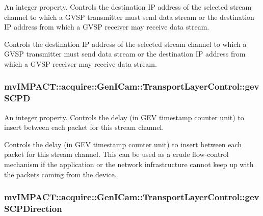 An integer property. Controls the destination I\+P address of the selected stream channel to which a G\+V\+S\+P transmitter must send data stream or the destination I\+P address from which a G\+V\+S\+P receiver may receive data stream. 

Controls the destination I\+P address of the selected stream channel to which a G\+V\+S\+P transmitter must send data stream or the destination I\+P address from which a G\+V\+S\+P receiver may receive data stream. \hypertarget{classmv_i_m_p_a_c_t_1_1acquire_1_1_gen_i_cam_1_1_transport_layer_control_a9364b85c25a2b2bb7f9e56a3076ee1be}{
\subsubsection[{gev\+S\+C\+P\+D}]{ mv\+I\+M\+P\+A\+C\+T\+::acquire\+::\+Gen\+I\+Cam\+::\+Transport\+Layer\+Control\+::gev\+S\+C\+P\+D}}\label{classmv_i_m_p_a_c_t_1_1acquire_1_1_gen_i_cam_1_1_transport_layer_control_a9364b85c25a2b2bb7f9e56a3076ee1be}


An integer property. Controls the delay (in G\+E\+V timestamp counter unit) to insert between each packet for this stream channel. 

Controls the delay (in G\+E\+V timestamp counter unit) to insert between each packet for this stream channel. This can be used as a crude flow-\/control mechanism if the application or the network infrastructure cannot keep up with the packets coming from the device. \hypertarget{classmv_i_m_p_a_c_t_1_1acquire_1_1_gen_i_cam_1_1_transport_layer_control_a01418fdc96130e97491eadf9fa865767}{
\subsubsection[{gev\+S\+C\+P\+Direction}]{ mv\+I\+M\+P\+A\+C\+T\+::acquire\+::\+Gen\+I\+Cam\+::\+Transport\+Layer\+Control\+::gev\+S\+C\+P\+Direction}}\label{classmv_i_m_p_a_c_t_1_1acquire_1_1_gen_i_cam_1_1_transport_layer_control_a01418fdc96130e97491eadf9fa865767}


